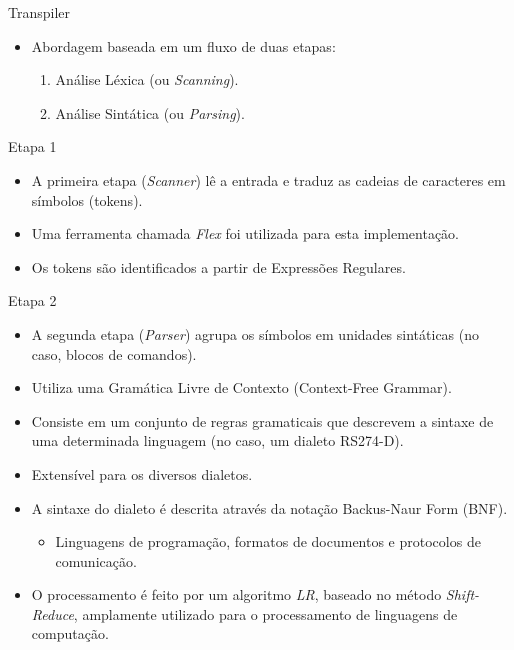 \documentclass[aspectratio=169]{beamer}
\begin{document}
{\begin{frame}{Transpiler}
  \begin{itemize}
    \item Abordagem baseada em um fluxo de duas etapas:
    \begin{enumerate}
      \item Análise Léxica (ou \emph{Scanning}).
      \item Análise Sintática (ou \emph{Parsing}).
    \end{enumerate}
  \end{itemize}
\end{frame}


\begin{frame}{Etapa 1}
  \begin{itemize}
    \item A primeira etapa (\emph{Scanner}) l\^e a entrada e traduz as 
          cadeias de caracteres em símbolos (tokens). 
    \item Uma ferramenta chamada \emph{Flex} foi utilizada para esta 
          implementa\c c\~ao.
    \item Os tokens são identificados a partir de Expressões Regulares.
  \end{itemize}
\end{frame}


\begin{frame}{Etapa 2}
  \begin{itemize}
    \item A segunda etapa (\emph{Parser}) agrupa os símbolos em unidades 
          sint\'aticas (no caso, blocos de comandos).
    \item Utiliza uma Gramática Livre de Contexto (Context-Free Grammar).
    \item Consiste em um conjunto de regras gramaticais que descrevem a 
          sintaxe de uma determinada linguagem (no caso, um dialeto RS274-D).
    \item Extensível para os diversos dialetos.
    \item A sintaxe do dialeto é descrita através da notação Backus-Naur 
          Form (BNF).
    \begin{itemize}
      \item Linguagens de programação, formatos de documentos e 
            protocolos de comunicação.
    \end{itemize}
    \item O processamento é feito por um algoritmo \emph{LR}, baseado no método 
          \emph{Shift-Reduce}, amplamente utilizado para o processamento 
          de linguagens de computação.
  \end{itemize}
\end{frame}




}
\end{document}
